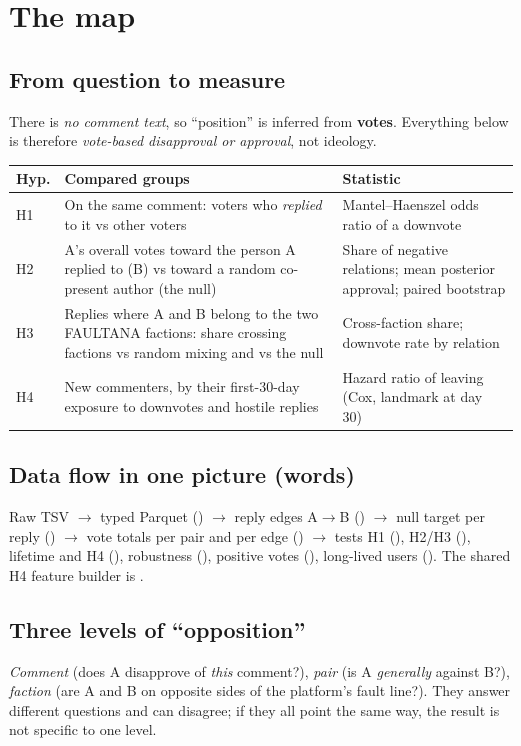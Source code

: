 \documentclass[11pt,a4paper]{article}
\newcommand{\file}[1]{\path{#1}}
\begin{document}
\section{The map}\label{sec:map}
\subsection{From question to measure}
There is \emph{no comment text}, so ``position'' is inferred from \textbf{votes}. Everything below is therefore \emph{vote-based disapproval or approval}, not ideology.

\begin{tabularx}{\textwidth}{@{}l Y Y@{}}
\toprule
Hyp. & Compared groups & Statistic \\
\midrule
H1 & On the same comment: voters who \emph{replied} to it vs other voters & Mantel--Haenszel odds ratio of a downvote \\
H2 & A's overall votes toward the person A replied to (B) vs toward a random co-present author (the null) & Share of negative relations; mean posterior approval; paired bootstrap \\
H3 & Replies where A and B belong to the two FAULTANA factions: share crossing factions vs random mixing and vs the null & Cross-faction share; downvote rate by relation \\
H4 & New commenters, by their first-30-day exposure to downvotes and hostile replies & Hazard ratio of leaving (Cox, landmark at day 30) \\
\bottomrule
\end{tabularx}

\subsection{Data flow in one picture (words)}
Raw TSV $\to$ typed Parquet (\file{00}) $\to$ reply edges A$\to$B (\file{01}) $\to$ null target per reply (\file{02}) $\to$ vote totals per pair and per edge (\file{03}) $\to$ tests H1 (\file{04}), H2/H3 (\file{05}), lifetime and H4 (\file{06}), robustness (\file{07}), positive votes (\file{08}), long-lived users (\file{09}). The shared H4 feature builder is \file{h4.py}.

\subsection{Three levels of ``opposition''}
\emph{Comment} (does A disapprove of \emph{this} comment?), \emph{pair} (is A \emph{generally} against B?), \emph{faction} (are A and B on opposite sides of the platform's fault line?). They answer different questions and can disagree; if they all point the same way, the result is not specific to one level.
\end{document}
